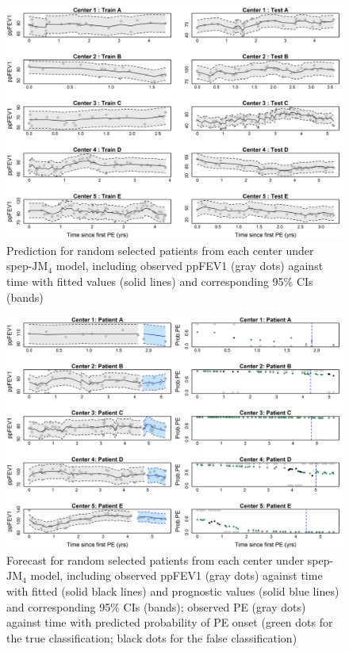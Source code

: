 \begin{figure}[ht]
\includegraphics[width=\textwidth]{Figures/Chp2_pred.jpg}
\caption{Prediction for random selected patients from each center under spep-$\mbox{JM}_4$ model, including observed ppFEV1 (gray dots) against time with fitted values (solid lines) and corresponding 95\% CIs (bands)}
\label{fig:pred}
\end{figure}

\begin{figure}[ht]
\includegraphics[width=\textwidth]{Figures/Chp2_mask.jpg}
\caption{Forecast for random selected patients from each center under spep-$\mbox{JM}_4$ model, including observed ppFEV1 (gray dots) against time with fitted (solid black lines) and prognostic values (solid blue lines) and corresponding 95\% CIs (bands); observed PE (gray dots) against time with predicted probability of PE onset (green dots for the true classification; black dots for the false classification)}
\label{fig:fcast}
\end{figure}

